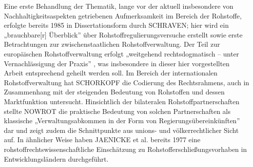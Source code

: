 \documentclass[12pt,a4paper,oneside]{book} %
\begin{document}
Eine erste Behandlung der Thematik, lange vor der aktuell insbesondere von Nachhaltigkeitsaspekten getriebenen Aufmerksamkeit im Bereich der Rohstoffe, erfolgte bereits 1985 in Dissertationsform durch SCHRAVEN;\autocite{schraven_internationale_1982} hier wird ein „brauchbare[r] Überblick” über Rohstoffregulierungsversuche erstellt sowie erste Betrachtungen zur zwischenstaatlichen Rohstoffverwaltung.\autocite{hanisch_besprechung_1984} Der Teil zur europäischen Rohstoffverwaltung erfolgt „weitgehend rechtsdogmatisch – unter Vernachlässigung der Praxis”\autocite{hanisch_besprechung_1984} , was insbesondere in dieser hier vorgestellten Arbeit entsprechend geheilt werden soll. Im Bereich der internationalen Rohstoffverwaltung hat SCHORKOPF die Codierung des Rechtsrahmens, auch in Zusammenhang mit der steigenden Bedeutung von Rohstoffen und dessen Marktfunktion untersucht.\autocite{schorkopf_internationale_2008} Hinsichtlich der bilateralen Rohstoffpartnerschaften stellte NOWROT die praktische Bedeutung von solchen Partnerschaften als klassische „Verwaltungsabkommen in der Form von Regierungsübereinkünften”\autocite{nowrot_bilaterale_2013} dar und zeigt zudem die Schnittpunkte aus unions- und völkerrechtlicher Sicht auf. In ähnlicher Weise haben JAENICKE et al. bereits 1977 eine rohstoffrechtswissenschaftliche Einschätzung zu Rohstofferschließungsvorhaben in Entwicklungsländern durchgeführt.\autocite{Rohstofferschließungsvorhaben in Entwicklungsländern}
\\
\end{document}
